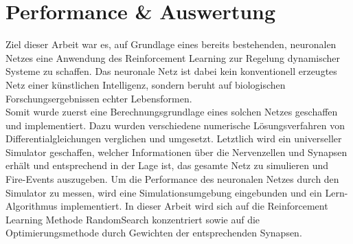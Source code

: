 %
\chapter{Performance \& Auswertung}
\label{chap:erg}
%
	Ziel dieser Arbeit war es, auf Grundlage eines bereits bestehenden, neuronalen Netzes eine Anwendung des Reinforcement Learning zur Regelung dynamischer Systeme zu schaffen. Das neuronale Netz ist dabei kein konventionell erzeugtes Netz einer künstlichen Intelligenz, sondern beruht auf biologischen Forschungsergebnissen echter Lebensformen.\\
	Somit wurde zuerst eine Berechnungsgrundlage eines solchen Netzes geschaffen und implementiert. Dazu wurden verschiedene numerische Lösungsverfahren von Differentialgleichungen verglichen und umgesetzt. Letztlich wird ein universeller Simulator geschaffen, welcher Informationen über die Nervenzellen und Synapsen erhält und entsprechend in der Lage ist, das gesamte Netz zu simulieren und Fire-Events auszugeben. Um die Performance des neuronalen Netzes durch den Simulator zu messen, wird eine Simulationsumgebung eingebunden und ein Lern-Algorithmus implementiert. In dieser Arbeit wird sich auf die Reinforcement Learning Methode RandomSearch konzentriert sowie auf die Optimierungsmethode durch Gewichten der entsprechenden Synapsen.

